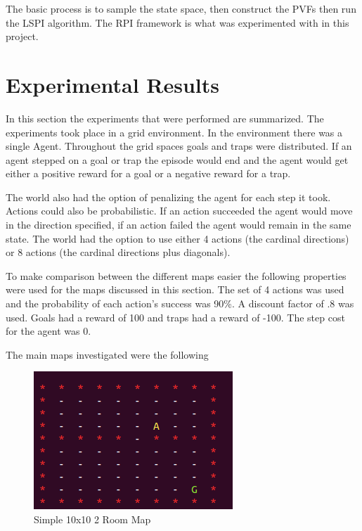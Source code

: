 \documentclass[12pt, letterpaper, final]{report}
\begin{document}
The basic process is to sample the state space, then construct the
PVFs then run the LSPI algorithm. The RPI framework is what was
experimented with in this project.

\section{Experimental Results}

In this section the experiments that were performed are
summarized. The experiments took place in a grid environment. In the
environment there was a single Agent. Throughout the grid spaces goals
and traps were distributed. If an agent stepped on a goal or trap the
episode would end and the agent would get either a positive reward for
a goal or a negative reward for a trap.

The world also had the option of penalizing the agent for each step it
took. Actions could also be probabilistic. If an action succeeded the
agent would move in the direction specified, if an action failed the
agent would remain in the same state. The world had the option to use
either 4 actions (the cardinal directions) or 8 actions (the cardinal
directions plus diagonals).

To make comparison between the different maps easier the following
properties were used for the maps discussed in this section. The
set of 4 actions was used and the probability of each action's success
was 90\%. A discount factor of .8 was used. Goals had a reward of 100
and traps had a reward of -100. The step cost for the agent was 0.

The main maps investigated were the following

\FloatBarrier
\begin{figure}[h!]
\centering
\includegraphics[scale=.5]{images/10x102room.png}
\caption{Simple 10x10 2 Room Map}
\label{10x102roomMap}
\end{figure}
\FloatBarrier
\end{document}
